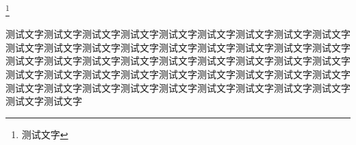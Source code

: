 \footnote{测试文字}

\firstrightxmark
{}


\noindent{}测试文字测试文字测试文字测试文字测试文字测试文字测试文字测试文字测试文字测试文字测试文字测试文字测试文字测试文字测试文字测试文字测试文字测试文字测试文字测试文字测试文字测试文字测试文字测试文字测试文字测试文字测试文字测试文字测试文字测试文字测试文字测试文字测试文字测试文字测试文字测试文字测试文字测试文字测试文字测试文字测试文字测试文字测试文字测试文字测试文字测试文字测试文字










